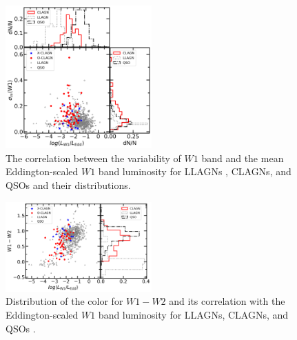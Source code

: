 \documentclass[linenumbers]{aastex631}
\begin{document}
\begin{figure}
\centering
	\includegraphics[width=0.5\textwidth]{pic/WISE_var_LW1_Ledd_hist.png}
    \caption{The correlation between the variability of $W1$ band and the mean Eddington-scaled $W1$ band luminosity for LLAGNs \citep{2009MNRAS.399..349G}, CLAGNs, and QSOs \citep{2007ApJ...667..131G} and their distributions. }
    \label{fig:var_ledd_hist}
\end{figure}


\begin{figure}
\centering
	\includegraphics[width=0.5\textwidth]{pic/WISE_W1-W2_LW1_Ledd_hist.png}
    \caption{Distribution of the color for $W1-W2$ and its correlation with the Eddington-scaled $W1$ band luminosity for LLAGNs\citep{2009MNRAS.399..349G}, CLAGNs, and QSOs \citep{2007ApJ...667..131G}. }
    \label{fig:color_ledd}
\end{figure}
\end{document}
